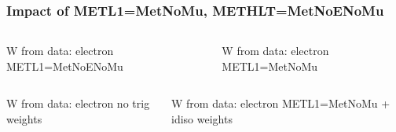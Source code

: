 \documentclass[red,compress,xcolor=table]{beamer}
\begin{document}
\begin{frame}
  \frametitle{Impact of METL1=MetNoMu, METHLT=MetNoENoMu}


\vspace*{-0.2cm}
\begin{columns}
  \begin{block}{\scriptsize W from data: electron METL1=MetNoENoMu}
    {\tiny
      
    }
  \end{block}
  \begin{block}{\scriptsize W from data: electron METL1=MetNoMu}
    {\tiny
      
    }
  \end{block}
\end{columns}
\begin{columns}
  \begin{block}{\scriptsize W from data:  electron no trig weights }
    {\tiny
      
    }
  \end{block}
  \begin{block}{\scriptsize W from data: electron METL1=MetNoMu + idiso weights}
    {\tiny
      
    }
  \end{block}
\end{columns}


\end{frame}
\end{document}
